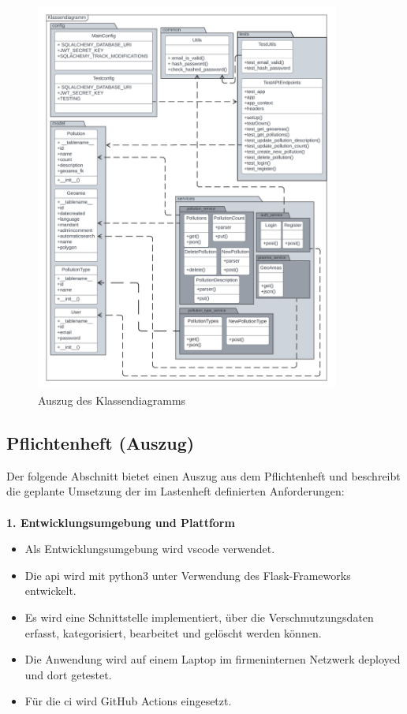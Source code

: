 \documentclass[a4paper,12pt]{article}
\begin{document}
\begin{figure}[h]
\centering
\includegraphics[width=0.89\textwidth]{bilder/klassendiagramm.png}
\caption{Auszug des Klassendiagramms}
\end{figure}

\clearpage
\subsection{Pflichtenheft (Auszug)}
\label{sec:pflichtenheft}

Der folgende Abschnitt bietet einen Auszug aus dem Pflichtenheft und beschreibt die geplante Umsetzung der im Lastenheft definierten Anforderungen:\\
\\
\noindent\textbf{1. Entwicklungsumgebung und Plattform}
\begin{itemize}
    \item Als Entwicklungsumgebung wird \acrshort{vscode} verwendet.
    \item Die \acrshort{api} wird mit \acrshort{python3} unter Verwendung des Flask-Frameworks entwickelt.
    \item Es wird eine Schnittstelle implementiert, über die Verschmutzungsdaten erfasst, kategorisiert, bearbeitet und gelöscht werden können.
    \item Die Anwendung wird auf einem Laptop im firmeninternen Netzwerk deployed und dort getestet.
    \item Für die \acrshort{ci} wird GitHub Actions eingesetzt.
\end{itemize}
\end{document}

